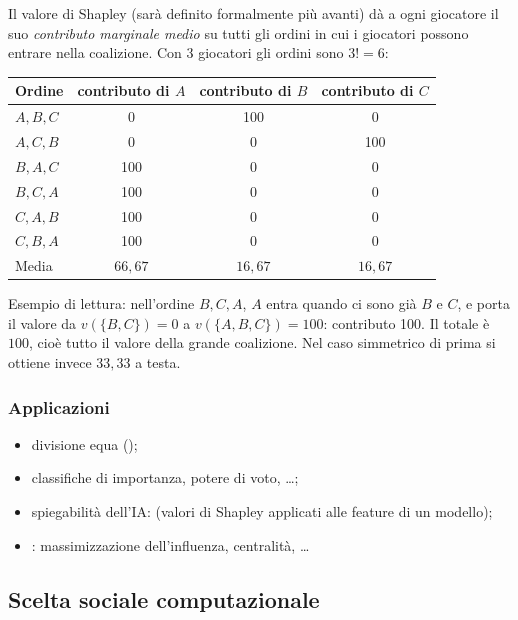 \begin{extra}
Il valore di Shapley (sarà definito formalmente più avanti) dà a ogni giocatore il suo
\emph{contributo marginale medio} su tutti gli ordini in cui i giocatori possono entrare
nella coalizione. Con 3 giocatori gli ordini sono $3! = 6$:

\begin{center}
\renewcommand{\arraystretch}{1.2}
\begin{tabular}{lccc}
\toprule
Ordine & contributo di $A$ & contributo di $B$ & contributo di $C$ \\
\midrule
$A,B,C$ & 0   & 100 & 0   \\
$A,C,B$ & 0   & 0   & 100 \\
$B,A,C$ & 100 & 0   & 0   \\
$B,C,A$ & 100 & 0   & 0   \\
$C,A,B$ & 100 & 0   & 0   \\
$C,B,A$ & 100 & 0   & 0   \\
\midrule
Media   & $66{,}67$ & $16{,}67$ & $16{,}67$ \\
\bottomrule
\end{tabular}
\end{center}
Esempio di lettura: nell'ordine $B,C,A$, $A$ entra quando ci sono già $B$ e $C$, e porta il valore
da $v(\{B,C\}) = 0$ a $v(\{A,B,C\}) = 100$: contributo 100.
Il totale è $100$, cioè tutto il valore della grande coalizione. Nel caso simmetrico
di prima si ottiene invece $33{,}33$ a testa.
\end{extra}

\subsubsection*{Applicazioni}
\begin{itemize}
  \item divisione equa ();
  \item classifiche di importanza, potere di voto, \ldots;
  \item spiegabilità dell'IA:  (valori di Shapley applicati alle feature di un modello);
  \item {}: massimizzazione dell'influenza, centralità, \ldots
\end{itemize}

\subsection{Scelta sociale computazionale}

